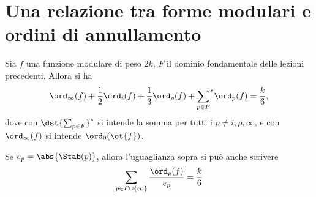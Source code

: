
\section{Una relazione tra forme modulari e ordini di annullamento}

\begin{teorema} \label{170201-forme-ordini}
	Sia $f$ una funzione modulare di peso $2k$, $F$ il dominio fondamentale delle lezioni precedenti. Allora si ha
	\begin{equation*}
	\ord_\infty(f)+\frac{1}{2}\ord_i(f)+\frac{1}{3}\ord_{\rho}(f)+{\sum_{p\in F}}^{*}\ord_p(f)=\frac{k}{6},
	\end{equation*}
	dove con $\dst{\sum_{p\in F}}^{*}$ si intende la somma per tutti i $p \neq i, \rho, \infty$, e con $\ord_\infty(f)$ si intende $\ord_0(\ot{f})$.
	
	Se $e_p=\abs{\Stab(p)}$, allora l'uguaglianza sopra si può anche scrivere
	\begin{equation*}
		\sum_{p\in F \cup \{\infty\}} \frac{\ord_p(f)}{e_p}=\frac{k}{6}
	\end{equation*}
\end{teorema}

